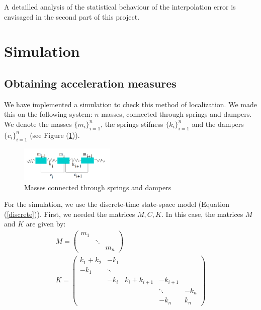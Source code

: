 \documentclass[journal]{IEEEtran}
\begin{document}
A detailled analysis of the statistical behaviour of the interpolation error is envisaged in the second part of this project.

\section{Simulation}

\subsection{Obtaining acceleration measures}

We have implemented a simulation to check this method of localization. We made this on the following system: $n$ masses, connected
through springs and dampers. We denote the masses $\{m_i\}_{i=1}^n$, the springs stifness $\{k_i\}_{i=1}^n$ and the dampers $\{c_i\}_{i=1}^n$ (see Figure (\ref{springs})).

\begin{figure}
  \centering
  \includegraphics[width=0.4\textwidth]{images/ressorts.png}
  \caption{Masses connected through springs and dampers}
  \label{springs}
\end{figure}

For the simulation, we use the discrete-time state-space model (Equation (\ref{discrete})). First, we needed the matrices $M, C, K$. In this case, the matrices $M$ and $K$ are given by:
\begin{equation}
\begin{array}{l}
M = 
\begin{pmatrix} 
m_1\\ 
&\ddots\\ 
&&m_n
\end{pmatrix} 
\\
K = 
\begin{pmatrix} 
k_1 + k_2 & - k_1 \\ 
- k_1 &\ddots\\ 
& -k_i & k_i + k_{i+1} & -k_{i+1} \\
&&&\ddots& -k_n\\
&&& -k_n & k_n
\end{pmatrix} 
\end{array}
\end{equation}
\end{document}
